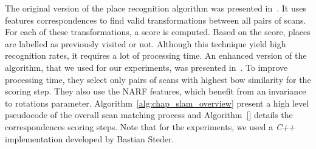 The original version of the place recognition algorithm was presented in~\cite{Steder2010}. It uses features correspondences to find valid transformations between all pairs of scans. For each of these transformations, a score is computed. Based on the score, places are labelled as previously visited or not. Although this technique yield high recognition rates, it requires a lot of processing time. An enhanced version of the algorithm, that we used for our experiments, was presented in~\cite{Steder2011b}. To improve processing time, they select only pairs of scans with highest \gls*{bow} similarity for the scoring step. They also use the NARF features, which benefit from an invariance to rotations parameter. Algorithm~\ref{alg:chap_slam_overview} present a high level pseudocode of the overall scan matching process and Algorithm~\ref{} details the correspondences scoring steps. Note that for the experiments, we used a \textit{C++} implementation developed by Bastian Steder.

